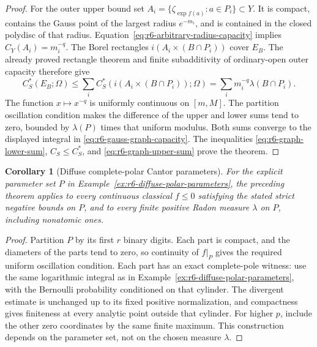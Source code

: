 \documentclass[11pt,a4paper]{article}
\numberwithin{equation}{section}
\newtheorem{corollary}[theorem]{Corollary}
\theoremstyle{definition}
\theoremstyle{remark}
\begin{document}
\begin{proof}
For the outer upper bound set
$A_i=\{\zeta_{\exp f(a)}:a\in P_i\}\subset Y$.
It is compact, contains the Gauss point of the largest radius
$e^{-m_i}$, and is contained in the closed polydisc of that radius.
Equation~\eqref{eq:r6-arbitrary-radius-capacity} implies
$C_Y(A_i)=m_i^{-q}$. The Borel rectangles
$i(A_i\times(B\cap P_i))$ cover $E_B$. The already proved
rectangle theorem and finite subadditivity of ordinary-open outer
capacity therefore give
\begin{equation}
             C_S^*(E_B;\Omega)
               \le\sum_i C_S^*(i(A_i\times(B\cap P_i));\Omega)
               =\sum_i m_i^{-q}\lambda(B\cap P_i).
 \label{eq:r6-graph-upper-sum}
\end{equation}
The function $x\mapsto x^{-q}$ is uniformly continuous on $[m,M]$.
The partition oscillation condition makes the difference of the upper
and lower sums tend to zero, bounded by $\lambda(P)$ times that
uniform modulus. Both sums converge to the displayed integral in
\eqref{eq:r6-gauss-graph-capacity}. The inequalities
\eqref{eq:r6-graph-lower-sum}, $C_S\le C_S^*$, and
\eqref{eq:r6-graph-upper-sum} prove the theorem.
\end{proof}

\begin{corollary}[Diffuse complete-polar Cantor parameters]
\label{cor:r6-cantor-gauss-graphs}
For the explicit parameter set $P$ in
Example~\ref{ex:r6-diffuse-polar-parameters}, the preceding theorem
applies to every continuous classical $f\le0$ satisfying the stated
strict negative bounds on $P$, and to every finite positive Radon
measure $\lambda$ on $P$, including nonatomic ones.
\end{corollary}

\begin{proof}
Partition $P$ by its first $r$ binary digits. Each part is compact,
and the diameters of the parts tend to zero, so continuity of $f|_P$
gives the required uniform oscillation condition. Each part has an
exact complete-pole witness: use the same logarithmic integral as in
Example~\ref{ex:r6-diffuse-polar-parameters}, with the Bernoulli
probability conditioned on that cylinder. The divergent estimate is
unchanged up to its fixed positive normalization, and compactness
gives finiteness at every analytic point outside that cylinder.
For higher $p$, include the other zero coordinates by the same finite
maximum. This construction depends on the parameter set, not on the
chosen measure $\lambda$.
\end{proof}
\end{document}
